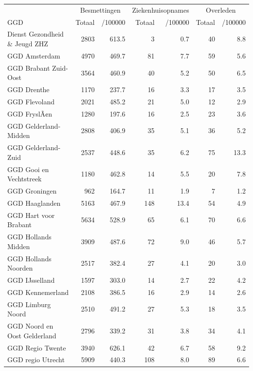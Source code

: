 \documentclass[
  english,
  man,floatsintext]{apa6}
\begin{document}
\begin{table}[H]
\centering\begingroup\fontsize{10}{12}\selectfont

\begin{threeparttable}
\begin{tabular}{lrrrrrr}
\toprule
\multicolumn{1}{c}{ } & \multicolumn{2}{c}{Besmettingen} & \multicolumn{2}{c}{Ziekenhuisopnames} & \multicolumn{2}{c}{Overleden} \\
\cmidrule(l{3pt}r{3pt}){2-3} \cmidrule(l{3pt}r{3pt}){4-5} \cmidrule(l{3pt}r{3pt}){6-7}
GGD & Totaal & /100000 & Totaal & /100000 & Totaal & /100000\\
\midrule
Dienst Gezondheid \& Jeugd ZHZ & 2803 & 613.5 & 3 & 0.7 & 40 & 8.8\\
GGD Amsterdam & 4970 & 469.7 & 81 & 7.7 & 59 & 5.6\\
GGD Brabant Zuid-Oost & 3564 & 460.9 & 40 & 5.2 & 50 & 6.5\\
GGD Drenthe & 1170 & 237.7 & 16 & 3.3 & 17 & 3.5\\
GGD Flevoland & 2021 & 485.2 & 21 & 5.0 & 12 & 2.9\\
GGD FryslÃ¢n & 1280 & 197.6 & 16 & 2.5 & 23 & 3.6\\
GGD Gelderland-Midden & 2808 & 406.9 & 35 & 5.1 & 36 & 5.2\\
GGD Gelderland-Zuid & 2537 & 448.6 & 35 & 6.2 & 75 & 13.3\\
GGD Gooi en Vechtstreek & 1180 & 462.8 & 14 & 5.5 & 20 & 7.8\\
GGD Groningen & 962 & 164.7 & 11 & 1.9 & 7 & 1.2\\
GGD Haaglanden & 5163 & 467.9 & 148 & 13.4 & 54 & 4.9\\
GGD Hart voor Brabant & 5634 & 528.9 & 65 & 6.1 & 70 & 6.6\\
GGD Hollands Midden & 3909 & 487.6 & 72 & 9.0 & 46 & 5.7\\
GGD Hollands Noorden & 2517 & 382.4 & 27 & 4.1 & 20 & 3.0\\
GGD IJsselland & 1597 & 303.0 & 14 & 2.7 & 22 & 4.2\\
GGD Kennemerland & 2108 & 386.5 & 16 & 2.9 & 14 & 2.6\\
GGD Limburg Noord & 2510 & 491.2 & 27 & 5.3 & 18 & 3.5\\
GGD Noord en Oost Gelderland & 2796 & 339.2 & 31 & 3.8 & 34 & 4.1\\
GGD Regio Twente & 3940 & 626.1 & 42 & 6.7 & 58 & 9.2\\
GGD regio Utrecht & 5909 & 440.3 & 108 & 8.0 & 89 & 6.6\\

\end{tabular}
\end{threeparttable}
\end{table}
\end{document}
